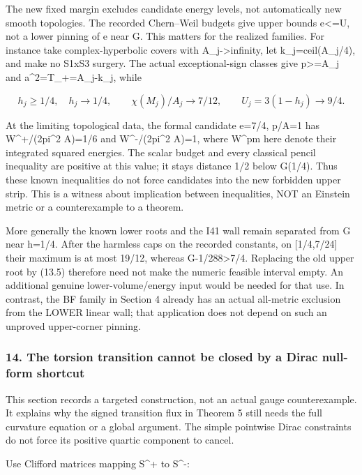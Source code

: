\documentclass[
  10pt,
]{article}
\begin{document}
The new fixed margin excludes candidate energy levels, not automatically
new smooth topologies. The recorded Chern--Weil budgets give upper
bounds e\textless=U, not a lower pinning of e near G. This matters for
the realized families. For instance take complex-hyperbolic covers with
A\_j-\textgreater infinity, let k\_j=ceil(A\_j/4), and make no S1xS3
surgery. The actual exceptional-sign classes give p\textgreater=A\_j and
a\^{}2=T\_+=A\_j-k\_j, while

\[
 h_j\ge1/4,\quad h_j\to1/4,\qquad
 \chi(M_j)/A_j\to7/12,\qquad U_j=3(1-h_j)\to9/4.
\]

At the limiting topological data, the formal candidate e=7/4, p/A=1 has
W\^{}+/(2pi\^{}2 A)=1/6 and W\^{}-/(2pi\^{}2 A)=1, where W\^{}pm here
denote their integrated squared energies. The scalar budget and every
classical pencil inequality are positive at this value; it stays
distance 1/2 below G(1/4). Thus these known inequalities do not force
candidates into the new forbidden upper strip. This is a witness about
implication between inequalities, NOT an Einstein metric or a
counterexample to a theorem.

More generally the known lower roots and the I41 wall remain separated
from G near h=1/4. After the harmless caps on the recorded constants, on
{[}1/4,7/24{]} their maximum is at most 19/12, whereas
G-1/288\textgreater7/4. Replacing the old upper root by (13.5) therefore
need not make the numeric feasible interval empty. An additional genuine
lower-volume/energy input would be needed for that use. In contrast, the
BF family in Section 4 already has an actual all-metric exclusion from
the LOWER linear wall; that application does not depend on such an
unproved upper-corner pinning.

\hypertarget{the-torsion-transition-cannot-be-closed-by-a-dirac-null-form-shortcut}{%
\subsubsection{14. The torsion transition cannot be closed by a Dirac
null-form
shortcut}\label{the-torsion-transition-cannot-be-closed-by-a-dirac-null-form-shortcut}}

This section records a targeted construction, not an actual gauge
counterexample. It explains why the signed transition flux in Theorem 5
still needs the full curvature equation or a global argument. The simple
pointwise Dirac constraints do not force its positive quartic component
to cancel.

Use Clifford matrices mapping S\^{}+ to S\^{}-:
\end{document}
